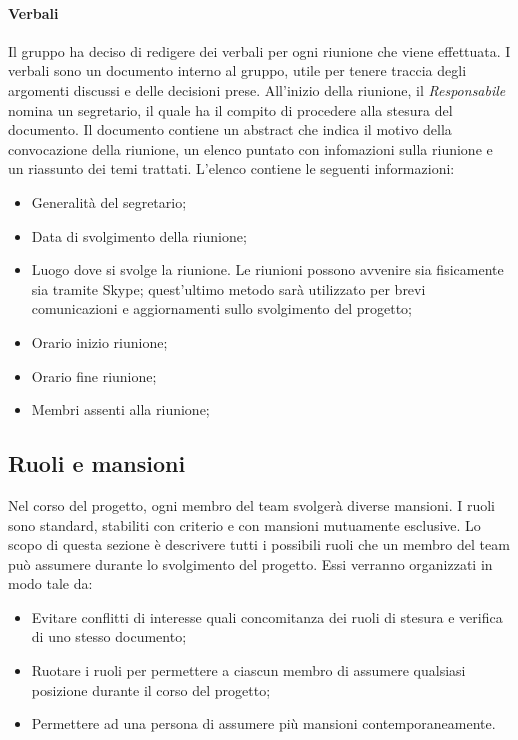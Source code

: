 			\paragraph{Verbali}
			Il gruppo ha deciso di redigere dei verbali per ogni riunione che viene effettuata. I verbali sono un documento interno al gruppo, utile per tenere traccia degli argomenti discussi e delle decisioni prese. All'inizio della riunione, il \textit{Responsabile} nomina un segretario, il quale ha il compito di procedere alla stesura del documento. Il documento contiene un abstract che indica il motivo della convocazione della riunione, un elenco puntato con infomazioni sulla riunione e un riassunto dei temi trattati. L'elenco contiene le seguenti informazioni:
			\begin{itemize}
				\item Generalità del segretario;
				\item Data di svolgimento della riunione;
				\item Luogo dove si svolge la riunione. Le riunioni possono avvenire sia fisicamente sia tramite Skype; quest'ultimo metodo sarà utilizzato per brevi comunicazioni e aggiornamenti sullo svolgimento del progetto;
				\item Orario inizio riunione;
				\item Orario fine riunione;
				\item Membri assenti alla riunione;
			\end{itemize}

	\subsection{Ruoli e mansioni}
	Nel corso del progetto, ogni membro del team svolgerà diverse mansioni. I ruoli sono standard, stabiliti con criterio e con mansioni mutuamente esclusive. Lo scopo di questa sezione è descrivere tutti i possibili ruoli che un membro del team può assumere durante lo svolgimento del progetto. Essi verranno organizzati in modo tale da:
	\begin{itemize}
		\item Evitare conflitti di interesse quali concomitanza dei ruoli di stesura e verifica di uno stesso documento;
		\item Ruotare i ruoli per permettere a ciascun membro di assumere qualsiasi posizione durante il corso del progetto;
		\item Permettere ad una persona di assumere più mansioni contemporaneamente.
	\end{itemize}

